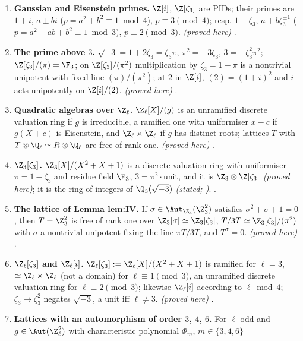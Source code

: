 \begin{enumerate}[label=\textbf{\thechapter.\arabic*}]
.
\item \textbf{Gaussian and Eisenstein primes.} $\Z[i]$, $\Z[\zeta_3]$ are PIDs; their primes are $1+i$, $a\pm bi$ ($p=a^2+b^2\equiv1\bmod 4$), $p\equiv3\pmod4$; resp.
$1-\zeta_3$, $a+b\zeta_3^{\pm1}$ ($p=a^2-ab+b^2\equiv1\bmod 3$), $p\equiv2\pmod3$. \emph{(proved here)} .
\item \textbf{The prime above $3$.} $\sqrt{-3}=1+2\zeta_3=\zeta_3\pi$, $\pi^2=-3\zeta_3$, $3=-\zeta_3^2\pi^2$; $\Z[\zeta_3]/(\pi)=\F_3$; on $\Z[\zeta_3]/(\pi^2)$ multiplication by
$\zeta_3=1-\pi$ is a nontrivial unipotent with fixed line $(\pi)/(\pi^2)$; at $2$ in $\Z[i]$, $(2)=(1+i)^2$ and $i$ acts unipotently on $\Z[i]/(2)$. \emph{(proved here)}
.
\item \textbf{Quadratic algebras over $\Z_\ell$.} $\Z_\ell[X]/(g)$ is an unramified discrete valuation ring if $\bar g$ is irreducible, a ramified one with uniformiser
$x-c$ if $g(X+c)$ is Eisenstein, and $\Z_\ell\times\Z_\ell$ if $\bar g$ has distinct roots; lattices $T$ with $T\otimes\Q_\ell\simeq R\otimes\Q_\ell$ are free of rank one.
\emph{(proved here)} .
\item \textbf{$\Z_3[\zeta_3]$.} $\Z_3[X]/(X^2+X+1)$ is a discrete valuation ring with uniformiser $\pi=1-\zeta_3$ and residue field $\F_3$, $3=\pi^2\cdot$unit, and it is
$\Z_3\otimes\Z[\zeta_3]$ \emph{(proved here)}; it is the ring of integers of $\Q_3(\sqrt{-3})$ \emph{(stated; )}. .
\item \textbf{The lattice of Lemma lem:IV.} If $\sigma\in\Aut_{\Z_3}(\Z_3^2)$ satisfies $\sigma^2+\sigma+1=0$, then $T=\Z_3^2$ is free of rank one over $\Z_3[\sigma]\simeq\Z_3[\zeta_3]$,
$T/3T\simeq\Z_3[\zeta_3]/(\pi^2)$ with $\sigma$ a nontrivial unipotent fixing the line $\pi T/3T$, and $T^\sigma=0$. \emph{(proved here)} .
\item \textbf{$\Z_\ell[\zeta_3]$ and $\Z_\ell[i]$.} $\Z_\ell[\zeta_3]:=\Z_\ell[X]/(X^2+X+1)$ is ramified for $\ell=3$, $\simeq\Z_\ell\times\Z_\ell$ (not a domain) for $\ell\equiv1\pmod3$,
an unramified discrete valuation ring for $\ell\equiv2\pmod3$; likewise $\Z_\ell[i]$ according to $\ell\bmod4$; $\zeta_3\mapsto\zeta_3^2$ negates $\sqrt{-3}$, a unit iff
$\ell\ne3$. \emph{(proved here)} .
\item \textbf{Lattices with an automorphism of order $3$, $4$, $6$.} For $\ell$ odd and $g\in\Aut(\Z_\ell^2)$ with characteristic polynomial $\Phi_m$, $m\in\{3,4,6\}$

\end{enumerate}
